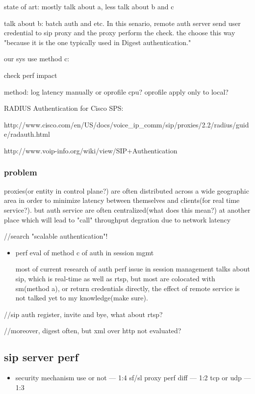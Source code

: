 \documentclass[•]{article}
\begin{document}
state of art\cite{Dacosta2011}:
mostly talk about a, less talk about b and c

\cite{Dacosta2011} talk about b: batch auth and etc. In this senario, remote auth server send user credential to sip proxy and the proxy perform the check. the choose this way "because it is the one typically used in Digest authentication." 

our sys use method c:

check perf impact

method: log latency manually or oprofile cpu? oprofile apply only to local?



RADIUS Authentication for Cisco SPS:

http://www.cisco.com/en/US/docs/voice\_ip\_comm/sip/proxies/2.2/radius/guide/radauth.html

http://www.voip-info.org/wiki/view/SIP+Authentication

\subsubsection{problem}
proxies(or entity in control plane?) are often distributed across a wide geographic area in order to minimize latency between themselves and clients(for real time service?). but auth service are often centralized(what does this mean?) at another place which will lead to "call" throughput degration  due to network latency\cite{Dacosta2011}

//search "scalable authentication"!

\begin{itemize}
\item perf eval of method c of auth in session mgmt

most of current research of auth perf issue in session management talks about sip, which is real-time as well as rtsp, but most are colocated with sm(method a), or return credentials directly, the effect of remote service is not talked yet to my knowledge(make sure).
\end{itemize}

//sip auth register, invite and bye, what about rtsp?

//moreover, digest often, but xml over http not evaluated?






\subsection{sip server perf}
\begin{itemize}
\item \cite{Nahum2007}
\subitem security mechanism use or not --- 1:4
\subitem sf/sl proxy perf diff --- 1:2
\subitem tcp or udp --- 1:3




\end{itemize}
\end{document}

